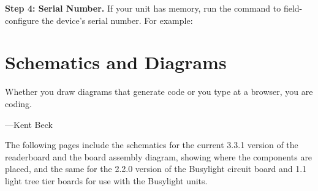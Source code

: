 {\bfseries Step 4: Serial Number.}
		If your unit has  memory,
		run the  command to field-configure the device's serial number. For example:
\begin{SourceCode}
\end{SourceCode}

%                                                            
\chapter{Schematics and Diagrams}
\epigraph{Whether you draw diagrams that generate code or you type at a browser, you are coding.}{---Kent Beck}
The following pages include the schematics for the current 3.3.1 version of the readerboard 
and the board assembly diagram, showing where the components are placed, and the same for the 2.2.0 version
of the Busylight circuit board and 1.1 light tree tier boards for use with the Busylight units.

